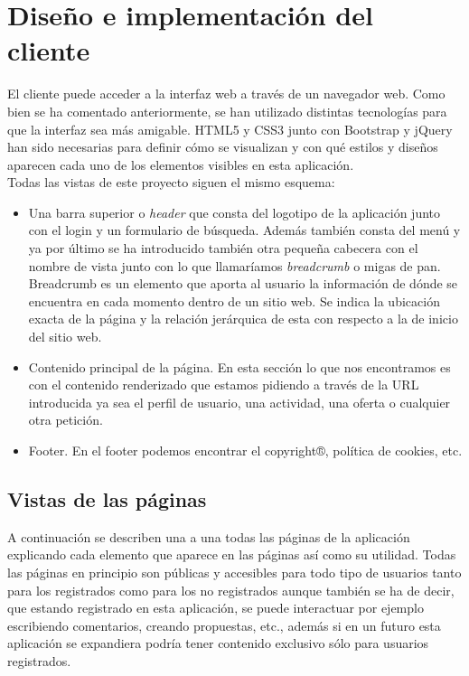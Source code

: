 \section{Diseño e implementación del cliente} 
\label{sec:cliente}
El cliente puede acceder a la interfaz web a través de un navegador web. Como bien se ha comentado anteriormente, se han utilizado distintas tecnologías para que la interfaz sea más amigable. HTML5 y CSS3 junto con Bootstrap y jQuery han sido necesarias para definir cómo se visualizan y con qué estilos y diseños aparecen cada uno de los elementos visibles en esta aplicación. \\
Todas las vistas de este proyecto siguen el mismo esquema:
\begin{itemize}
\item Una barra superior o \textit{header} que consta del logotipo de la aplicación junto con el login y un formulario de búsqueda. Además también consta del menú y ya por último se ha introducido también otra pequeña cabecera con el nombre de vista junto con lo que llamaríamos \textit{breadcrumb} o migas de pan.  Breadcrumb es un elemento que aporta al usuario la información de dónde se encuentra en cada momento dentro de un sitio web. Se indica la ubicación exacta de la página y la relación jerárquica de esta con respecto a la de inicio del sitio web.
\item Contenido principal de la página. En esta sección lo que nos encontramos es con el contenido renderizado que estamos pidiendo a través de la URL introducida ya sea el perfil de usuario, una actividad, una oferta o cualquier otra petición.
\item Footer. En el footer podemos encontrar el copyright®, política de cookies, etc.
\end{itemize}

\subsection{Vistas de las páginas} 
\label{subsec:vistas}
A continuación se describen una a una todas las páginas de la aplicación explicando cada elemento que aparece en las páginas así como su utilidad. Todas las páginas en principio son públicas y accesibles para todo tipo de usuarios tanto para los registrados como para los no registrados aunque también se ha de decir, que estando registrado en esta aplicación, se puede interactuar por ejemplo escribiendo comentarios, creando propuestas, etc., además si en un futuro esta aplicación se expandiera podría tener contenido exclusivo sólo para usuarios registrados.

